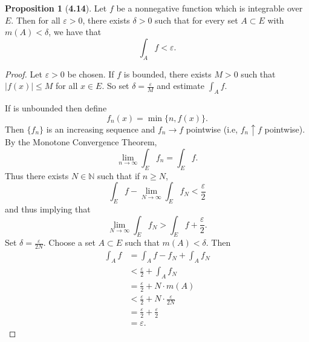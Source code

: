 \documentclass[12pt]{article}
\newcommand{\N}{\mathbb{N}}
\renewcommand{\epsilon}{\varepsilon}
\theoremstyle{definition}
\newtheorem*{prop}{Proposition}
\begin{document}
\begin{prop}[\textbf{4.14}]

  Let \( f \) be a nonnegative function which is integrable over \( E \). Then for all \( \epsilon > 0 \), there exists \( \delta > 0 \) such that for every set \( A \subset E \) with \( m(A) < \delta \), we have that
    \[
      \int_{A} f < \epsilon.
    \]
    \begin{proof}
      Let \( \epsilon > 0 \) be chosen. If \( f \) is bounded, there exists \( M > 0 \) such that \( |f(x)| \leq M \) for all \( x \in E \). So set \( \displaystyle \delta = \frac{\epsilon}{M} \) and estimate \( \displaystyle \int_{A} f \).

      If is unbounded then define 
        \[
            f_n(x) = \min \{ n, f(x) \}.
        \]
      Then \( \{f_n\} \) is an increasing sequence and \( f_n \to f \) pointwise (i.e, \( f_n \uparrow f \) pointwise). By the Monotone Convergence Theorem,
        \[
            \lim_{n \to \infty} \int_{E} f_n = \int_{E} f.
        \]
      Thus there exists \( N \in \N \) such that if \( n \geq N \),
        \[
            \int_{E} f - \lim_{N \to \infty }\int_{E} f_N < \frac{\epsilon}{2}
        \]
      and thus implying that 
        \[
          \lim_{N \to \infty }\int_{E} f_N > \int_{E} f + \frac{\epsilon}{2}.
        \]
      Set \( \displaystyle \delta = \frac{\epsilon}{2N} \). Choose a set \( A \subset E \) such that \( m(A) < \delta \). Then 
        \begin{align*}
          \int_{A} f &= \int_{A} f - f_N + \int_{A} f_N \\
                     &< \frac{\epsilon}{2} + \int_{A} f_N \\
                     &= \frac{\epsilon}{2} + N \cdot m(A) \\
                     &< \frac{\epsilon}{2} + N \cdot \frac{\epsilon}{2N} \\
                     &= \frac{\epsilon}{2} + \frac{\epsilon}{2} \\
                     &= \epsilon.
        \end{align*}
    \end{proof}
\end{prop}
\end{document}
